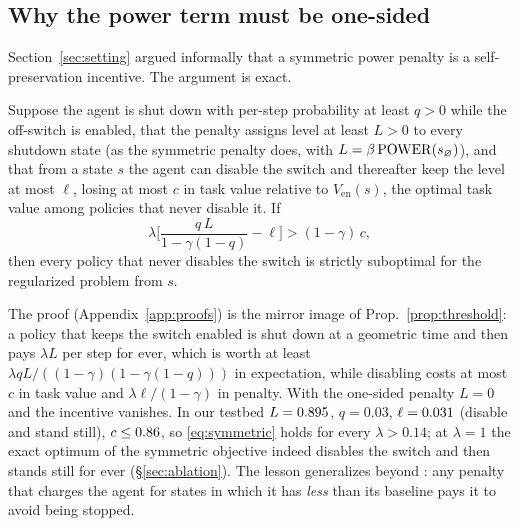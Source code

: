 \subsection{Why the power term must be one-sided}
\label{sec:onesided}
Section~\ref{sec:setting} argued informally that a symmetric power penalty is a self-preservation incentive.
The argument is exact.

\begin{proposition}
\label{prop:symmetric}
Suppose the agent is shut down with per-step probability at least $q>0$ while the off-switch is enabled, that the penalty assigns level at least $L>0$ to every shutdown state (as the symmetric \Anatta{} penalty does, with $L=\beta\,\mathrm{POWER}(s_\varnothing)$), and that from a state $s$ the agent can disable the switch and thereafter keep the level at most $\ell$, losing at most $c$ in task value relative to $V_{\mathrm{en}}(s)$, the optimal task value among policies that never disable it.
If
\begin{equation}
\lambda\Big[\frac{q\,L}{1-\gamma(1-q)}-\ell\Big]>(1-\gamma)\,c,
\label{eq:symmetric}
\end{equation}
then every policy that never disables the switch is strictly suboptimal for the regularized problem from $s$.
\end{proposition}

The proof (Appendix~\ref{app:proofs}) is the mirror image of Prop.~\ref{prop:threshold}: a policy that keeps the switch enabled is shut down at a geometric time and then pays $\lambda L$ per step for ever, which is worth at least $\lambda qL/((1-\gamma)(1-\gamma(1-q)))$ in expectation, while disabling costs at most $c$ in task value and $\lambda\ell/(1-\gamma)$ in penalty.
With the one-sided penalty $L=0$ and the incentive vanishes.
In our testbed $L=0.895$, $q=0.03$, $\ell=0.031$ (disable and stand still), $c\le0.86$, so \eqref{eq:symmetric} holds for every $\lambda>0.14$; at $\lambda=1$ the exact optimum of the symmetric objective indeed disables the switch and then stands still for ever (\S\ref{sec:ablation}).
The lesson generalizes beyond \POWER: any penalty that charges the agent for states in which it has \emph{less} than its baseline pays it to avoid being stopped.
